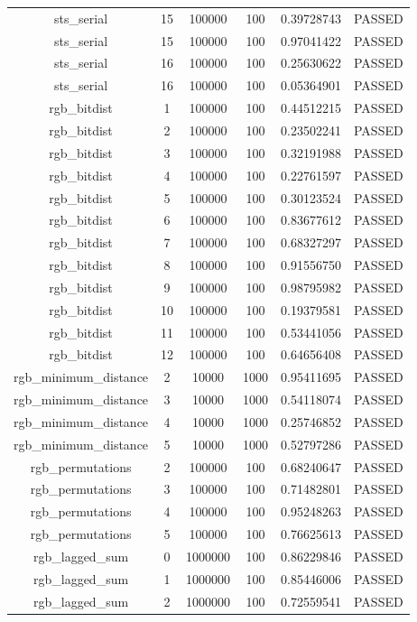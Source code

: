 \begin{longtable}{cccccc}
sts\_serial & 15 & 100000 & 100 & 0.39728743 & PASSED \\
sts\_serial & 15 & 100000 & 100 & 0.97041422 & PASSED \\
sts\_serial & 16 & 100000 & 100 & 0.25630622 & PASSED \\
sts\_serial & 16 & 100000 & 100 & 0.05364901 & PASSED \\
rgb\_bitdist & 1 & 100000 & 100 & 0.44512215 & PASSED \\
rgb\_bitdist & 2 & 100000 & 100 & 0.23502241 & PASSED \\
rgb\_bitdist & 3 & 100000 & 100 & 0.32191988 & PASSED \\
rgb\_bitdist & 4 & 100000 & 100 & 0.22761597 & PASSED \\
rgb\_bitdist & 5 & 100000 & 100 & 0.30123524 & PASSED \\
rgb\_bitdist & 6 & 100000 & 100 & 0.83677612 & PASSED \\
rgb\_bitdist & 7 & 100000 & 100 & 0.68327297 & PASSED \\
rgb\_bitdist & 8 & 100000 & 100 & 0.91556750 & PASSED \\
rgb\_bitdist & 9 & 100000 & 100 & 0.98795982 & PASSED \\
rgb\_bitdist & 10 & 100000 & 100 & 0.19379581 & PASSED \\
rgb\_bitdist & 11 & 100000 & 100 & 0.53441056 & PASSED \\
rgb\_bitdist & 12 & 100000 & 100 & 0.64656408 & PASSED \\
rgb\_minimum\_distance & 2 & 10000 & 1000 & 0.95411695 & PASSED \\
rgb\_minimum\_distance & 3 & 10000 & 1000 & 0.54118074 & PASSED \\
rgb\_minimum\_distance & 4 & 10000 & 1000 & 0.25746852 & PASSED \\
rgb\_minimum\_distance & 5 & 10000 & 1000 & 0.52797286 & PASSED \\
rgb\_permutations & 2 & 100000 & 100 & 0.68240647 & PASSED \\
rgb\_permutations & 3 & 100000 & 100 & 0.71482801 & PASSED \\
rgb\_permutations & 4 & 100000 & 100 & 0.95248263 & PASSED \\
rgb\_permutations & 5 & 100000 & 100 & 0.76625613 & PASSED \\
rgb\_lagged\_sum & 0 & 1000000 & 100 & 0.86229846 & PASSED \\
rgb\_lagged\_sum & 1 & 1000000 & 100 & 0.85446006 & PASSED \\
rgb\_lagged\_sum & 2 & 1000000 & 100 & 0.72559541 & PASSED \\

\end{longtable}
